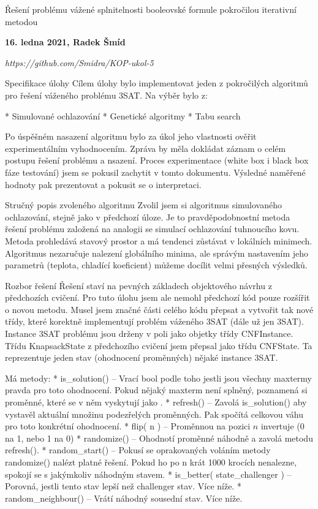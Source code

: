 
\chyph

\tit Řešení problému vážené splnitelnosti booleovské formule pokročilou iterativní metodou
\centerline{\bf 16. ledna 2021, Radek Šmíd}
\medskip
\centerline{\it https://github.com/Smidra/KOP-ukol-5}


\sec Specifikace úlohy
Cílem úlohy bylo implementovat jeden z pokročilých algoritmů pro řešení váženého problému 3SAT.\break
Na výběr bylo z:

\begitems
* Simulované ochlazování
* Genetické algoritmy
* Tabu search
\enditems

Po úspěšném nasazení algoritmu bylo za úkol jeho vlastnosti ověřit experimentálním vyhodnocením. Zpráva by měla dokládat záznam o celém postupu řešení problému a nsazení. Proces experimentace (white box i black box fáze testování) jsem se pokusil zachytit v tomto dokumentu. Výsledné naměřené hodnoty pak prezentovat a pokusit se o interpretaci.


\sec Stručný popis zvoleného algoritmu
Zvolil jsem si algoritmus simulovaného ochlazování, stejně jako v předchozí úloze. Je to pravděpodobnostní metoda řešení problému založená na analogii se simulací ochlazování tuhnoucího kovu. Metoda prohledává stavový prostor a má tendenci zůstávat v lokálních minimech. Algoritmus nezaručuje nalezení globálního minima, ale správým nastavením jeho parametrů (teplota, chladící koeficient) můžeme docílit velmi přesných výsledků.


\sec Rozbor řešení
Řešení staví na pevných základech objektového návrhu z předchozích cvičení. Pro tuto úlohu jsem ale nemohl předchozí kód pouze rozšířit o novou metodu. Musel jsem značné části celého kódu přepsat a vytvořit tak nové třídy, které korektně implementují problém váženého 3SAT (dále už jen 3SAT). Instance 3SAT problému jsou drženy v poli jako objetky třídy CNFInstance. Třídu KnapsackState z předchozího cvičení jsem přepsal jako třídu CNFState. Ta reprezentuje jeden stav (ohodnocení proměnných) nějaké instance 3SAT.

Má metody:
\begitems
* is\_solution() -- Vrací bool podle toho jestli jsou všechny maxtermy pravda pro toto ohodnocení. Pokud nějaký maxterm není splněný, poznamená si proměnné, které se v něm vyskytují jako .
* refresh() -- Zavolá is\_solution() aby vystavěl aktuální množinu podezřelých proměnných. Pak spočítá celkovou váhu pro toto konkrétní ohodnocení.
* flip( n ) -- Proměnnou na pozici $n$ invertuje (0 na 1, nebo 1 na 0)
* randomize() -- Ohodnotí proměnné náhodně a zavolá metodu refresh().
* random\_start() -- Pokusí se oprakovaných voláním metody randomize() nalézt platné řešení. Pokud ho po n krát 1000 krocích nenalezne, spokojí se s jakýmkoliv náhodným stavem.
* is\_better( state\_challenger ) -- Porovná, jestli tento stav lepší než challenger stav. Více níže.
* random\_neighbour() -- Vrátí náhodný sousední stav. Více níže.
\enditems

